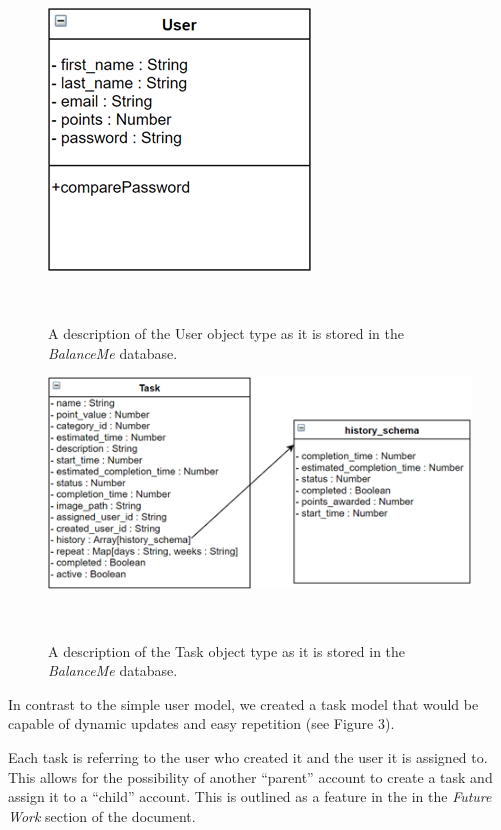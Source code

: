 \documentclass{sigchi}
\begin{document}
\begin{figure}
\centering
  \includegraphics[width=0.6\columnwidth]{figures/user}
  \caption{A description of the User object type as it is stored in the
	\textit{BalanceMe} database. }~\label{fig:figure2}
\end{figure}

\begin{figure}
\centering
  \includegraphics[width=1.0\columnwidth]{figures/task}
  \caption{A description of the Task object type as it is stored in the
	\textit{BalanceMe} database. }~\label{fig:figure3}
\end{figure}

In contrast to the simple user model, we created a task model that would be
capable of dynamic updates and easy repetition (see Figure 3).

Each task is referring to the user who created it and the user it is assigned
to. This allows for the possibility of another ``parent'' account to create a
task and assign it to a ``child'' account. This is outlined as a feature in the
in the \textit{Future Work} section of the document.
\end{document}
